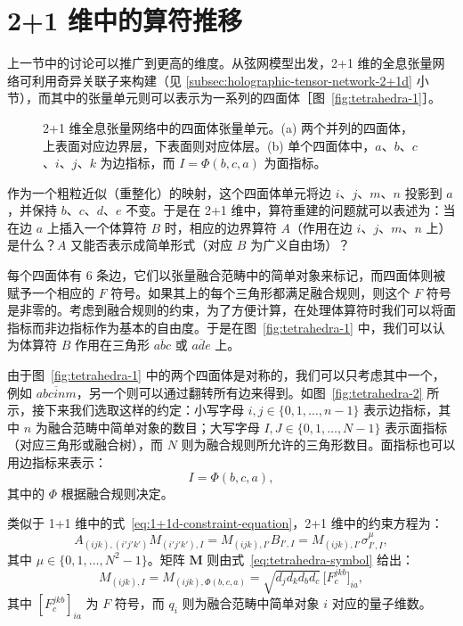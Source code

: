 \section{2+1 维中的算符推移}

上一节中的讨论可以推广到更高的维度。从弦网模型出发，2+1 维的全息张量网络可利用奇异关联子来构建（见 \ref{subsec:holographic-tensor-network-2+1d} 小节），而其中的张量单元则可以表示为一系列的四面体［图~\ref{fig:tetrahedra-1}］。

\begin{figure}[htb]
  \centering
   \qquad
  \caption[2+1 维全息张量网络中的四面体张量单元]{2+1 维全息张量网络中的四面体张量单元。(a) 两个并列的四面体，上表面对应边界层，下表面则对应体层。(b) 单个四面体中，$a$、$b$、$c$、$i$、$j$、$k$ 为边指标，而 $I=\Phi(b,c,a)$ 为面指标。}
\end{figure}

作为一个粗粒近似（重整化）的映射，这个四面体单元将边 $i$、$j$、$m$、$n$ 投影到 $a$，并保持 $b$、$c$、$d$、$e$ 不变。于是在 2+1 维中，算符重建的问题就可以表述为：当在边 $a$ 上插入一个体算符 $B$ 时，相应的边界算符 $A$（作用在边 $i$、$j$、$m$、$n$ 上）是什么？$A$ 又能否表示成简单形式（对应 $B$ 为广义自由场）？

每个四面体有 6 条边，它们以张量融合范畴中的简单对象来标记，而四面体则被赋予一个相应的 $F$ 符号。如果其上的每个三角形都满足融合规则，则这个 $F$ 符号是非零的。考虑到融合规则的约束，为了方便计算，在处理体算符时我们可以将面指标而非边指标作为基本的自由度。于是在图~\ref{fig:tetrahedra-1} 中，我们可以认为体算符 $B$ 作用在三角形 $\overline{abc}$ 或 $\overline{ade}$ 上。

由于图~\ref{fig:tetrahedra-1} 中的两个四面体是对称的，我们可以只考虑其中一个，例如 $\overline{abcinm}$，另一个则可以通过翻转所有边来得到。如图~\ref{fig:tetrahedra-2} 所示，接下来我们选取这样的约定：小写字母 $i,j\in\{0,1,\dots,n-1\}$ 表示边指标，其中 $n$ 为融合范畴中简单对象的数目；大写字母 $I, J\in \{0,1,\dots,N-1\}$ 表示面指标（对应三角形或融合树），而 $N$ 则为融合规则所允许的三角形数目。面指标也可以用边指标来表示：
\begin{equation}
  I = \Phi(b,c,a),
\end{equation}
其中的 $\Phi$ 根据融合规则决定。

类似于 1+1 维中的式~\eqref{eq:1+1d-constraint-equation}，2+1 维中的约束方程为：
\begin{equation}
    A_{(ijk), (i'j'k')} M_{(i'j'k'), I}
  = M_{(ijk), I'} B_{I', I}
  = M_{(ijk), I'} \sigma^\mu_{I', I},
\end{equation}
其中 $\mu\in\{0,1,\dots,N^2-1\}$。矩阵 $\bm{M}$ 则由式~\eqref{eq:tetrahedra-symbol} 给出：
\begin{equation}
  M_{(ijk), I} = M_{(ijk), \Phi(b,c,a)} = \sqrt{d_j d_k d_b d_c} \, \bigl[ F^{jkb}_c \bigr]_{ia},
\end{equation}
其中 $[F^{jkb}_c]_{ia}$ 为 $F$ 符号，而 $q_i$ 则为融合范畴中简单对象 $i$ 对应的量子维数。

